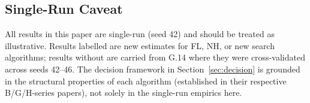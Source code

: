 \subsection{Single-Run Caveat}
\label{sec:caveat}

All results in this paper are single-run (seed 42) and should be treated as
illustrative.
Results labelled \dag{} are new estimates for FL, NH, or new search algorithms;
results without \dag{} are carried from G.14 where they were cross-validated
across seeds 42--46.
The decision framework in Section~\ref{sec:decision} is grounded in the
structural properties of each algorithm (established in their respective
B/G/H-series papers), not solely in the single-run empirics here.
